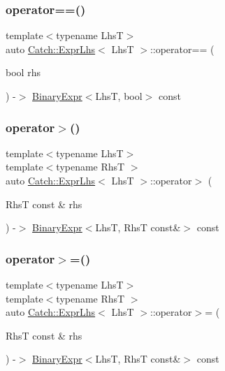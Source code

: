 \subsubsection{\texorpdfstring{operator==()}{operator==()}\hspace{0.1cm}{\footnotesize\ttfamily [2/2]}}
{\footnotesize\ttfamily template$<$typename LhsT$>$ \\
auto \mbox{\hyperlink{class_catch_1_1_expr_lhs}{Catch\+::\+Expr\+Lhs}}$<$ LhsT $>$\+::operator== (\begin{DoxyParamCaption}\item[{bool}]{rhs }\end{DoxyParamCaption}) -\/$>$ \mbox{\hyperlink{class_catch_1_1_binary_expr}{Binary\+Expr}}$<$LhsT, bool$>$ const \hspace{0.3cm}{\ttfamily [inline]}}

\mbox{\label{class_catch_1_1_expr_lhs_a23cb0cd983a1ac9c3df5160542199b83}} 
\subsubsection{\texorpdfstring{operator$>$()}{operator>()}}
{\footnotesize\ttfamily template$<$typename LhsT$>$ \\
template$<$typename RhsT $>$ \\
auto \mbox{\hyperlink{class_catch_1_1_expr_lhs}{Catch\+::\+Expr\+Lhs}}$<$ LhsT $>$\+::operator$>$ (\begin{DoxyParamCaption}\item[{RhsT const \&}]{rhs }\end{DoxyParamCaption}) -\/$>$ \mbox{\hyperlink{class_catch_1_1_binary_expr}{Binary\+Expr}}$<$LhsT, RhsT const\&$>$ const \hspace{0.3cm}{\ttfamily [inline]}}

\mbox{\label{class_catch_1_1_expr_lhs_aff594ae5b957105c517a6257d2e730f0}} 
\subsubsection{\texorpdfstring{operator$>$=()}{operator>=()}}
{\footnotesize\ttfamily template$<$typename LhsT$>$ \\
template$<$typename RhsT $>$ \\
auto \mbox{\hyperlink{class_catch_1_1_expr_lhs}{Catch\+::\+Expr\+Lhs}}$<$ LhsT $>$\+::operator$>$= (\begin{DoxyParamCaption}\item[{RhsT const \&}]{rhs }\end{DoxyParamCaption}) -\/$>$ \mbox{\hyperlink{class_catch_1_1_binary_expr}{Binary\+Expr}}$<$LhsT, RhsT const\&$>$ const \hspace{0.3cm}{\ttfamily [inline]}}

